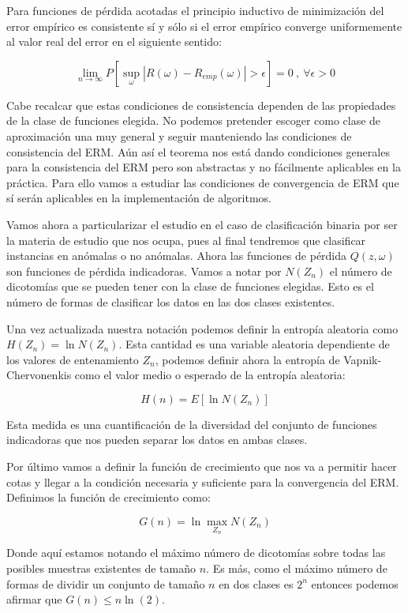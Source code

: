 \begin{teorema}
	Para funciones de pérdida acotadas el principio inductivo de minimización del error empírico es consistente sí y sólo si el error empírico converge uniformemente al valor real del error en el siguiente sentido:
	
	$$\lim\limits_{n\rightarrow \infty} P[\sup_{\omega}|R(\omega) - R_{emp}(\omega)|>\epsilon] = 0 \ , \ \forall \epsilon >0$$
\end{teorema}

Cabe recalcar que estas condiciones de consistencia dependen de las propiedades de la clase de funciones elegida. No podemos pretender escoger como clase de aproximación una muy general y seguir manteniendo las condiciones de consistencia del ERM. Aún así el teorema nos está dando condiciones generales para la consistencia del ERM pero son abstractas y no fácilmente aplicables en la práctica. Para ello vamos a estudiar las condiciones de convergencia de ERM que sí serán aplicables en la implementación de algoritmos.

Vamos ahora a particularizar el estudio en el caso de clasificación binaria por ser la materia de estudio que nos ocupa, pues al final tendremos que clasificar instancias en anómalas o no anómalas. Ahora las funciones de pérdida $Q(z,\omega)$ son funciones de pérdida indicadoras. Vamos a notar por $N(Z_n)$ el número de dicotomías que se pueden tener con la clase de funciones elegidas. Esto es el número de formas de clasificar los datos en las dos clases existentes.

Una vez actualizada nuestra notación podemos definir la entropía aleatoria como $H(Z_n) = \ln N(Z_n)$. Esta cantidad es una variable aleatoria dependiente de los valores de entenamiento $Z_n$, podemos definir ahora la entropía de Vapnik-Chervonenkis como el valor medio o esperado de la entropía aleatoria:

$$H(n) = E[\ln N(Z_n)]$$

Esta medida es una cuantificación de la diversidad del conjunto de funciones indicadoras que nos pueden separar los datos en ambas clases.

Por último vamos a definir la función de crecimiento que nos va a permitir hacer cotas y llegar a la condición necesaria y suficiente para la convergencia del ERM. Definimos la función de crecimiento como:

$$G(n) = \ln \max_{Z_n} N(Z_n)$$

Donde aquí estamos notando el máximo número de dicotomías sobre todas las posibles muestras existentes de tamaño $n$. Es más, como el máximo número de formas de dividir un conjunto de tamaño $n$ en dos clases es $2^n$ entonces podemos afirmar que $G(n)\leq n\ln (2)$.

